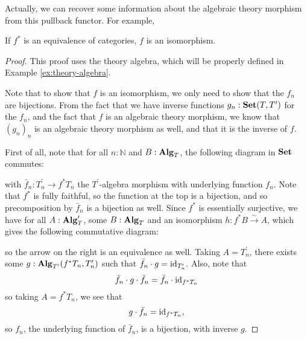 Actually, we can recover some information about the algebraic theory morphism from this pullback functor. For example,
\begin{lemma}\label{lem:algebra-pullback-equivalence}
  If $ f^* $ is an equivalence of categories, $ f $ is an isomorphism.
\end{lemma}
\begin{proof}
  This proof uses the theory algebra, which will be properly defined in Example \ref{ex:theory-algebra}.

  Note that to show that $ f $ is an isomorphism, we only need to show that the $ f_n $ are bijections. From the fact that we have inverse functions $ g_n : \mathbf{Set}(T, T^\prime) $ for the $ f_n $, and the fact that $ f $ is an algebraic theory morphism, we know that $ (g_n)_n $ is an algebraic theory morphism as well, and that it is the inverse of $ f $.

  First of all, note that for all $ n : \mathbb N $ and $ B : \mathbf{Alg}_{T} $, the following diagram in $ \mathbf{Set} $ commutes:
  \begin{center}
  \end{center}
  with $ \bar f_n: T^\prime_n \to f^* T_n $ the $ T^\prime $-algebra morphism with underlying function $ f_n $. Note that $ f^* $ is fully faithful, so the function at the top is a bijection, and so precomposition by $ \bar f_n $ is a bijection as well. Since $ f^* $ is essentially surjective, we have for all $ A : \mathbf{Alg}_{T}^\prime $, some $ B : \mathbf{Alg}_{T} $ and an isomorphism $ h: f^* B \xrightarrow \sim A $, which gives the following commutative diagram:
  \begin{center}
  \end{center}
  so the arrow on the right is an equivalence as well. Taking $ A = T^\prime_n $, there exists some $ g: \mathbf{Alg}_{T^\prime}(f^* T_n, T^\prime_n) $ such that $ \bar f_n \cdot g = \text{id}_{T^\prime_n} $. Also, note that
  \[ \bar f_n \cdot g \cdot \bar f_n = \bar f_n \cdot \text{id}_{f^* T_n} \]
  so taking $ A = f^* T_n $, we see that
  \[ g \cdot \bar f_n = \text{id}_{f^* T_n}, \]
  so $ f_n $, the underlying function of $ \bar f_n $, is a bijection, with inverse $ g $.
\end{proof}

